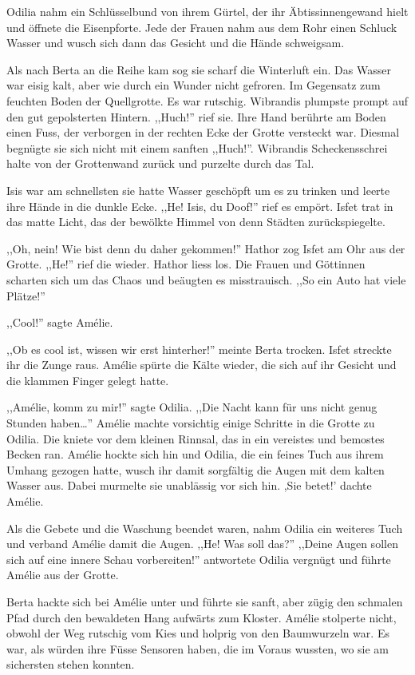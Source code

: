 Odilia nahm ein Schlüsselbund von ihrem Gürtel, der ihr Äbtissinnengewand hielt und öffnete die Eisenpforte. Jede der Frauen nahm aus dem Rohr einen Schluck Wasser und wusch sich dann das Gesicht und die Hände schweigsam.

Als \am nach Berta an die Reihe kam sog sie scharf die Winterluft ein. Das Wasser war eisig kalt, aber wie durch ein Wunder nicht gefroren. Im Gegensatz zum feuchten Boden der Quellgrotte. Es war rutschig. Wibrandis plumpste prompt auf den gut gepolsterten Hintern. ,,Huch!'' rief sie. Ihre Hand berührte am Boden einen Fuss, der verborgen in der rechten Ecke der Grotte versteckt war. Diesmal begnügte sie sich nicht mit einem sanften ,,Huch!''. Wibrandis Scheckensschrei halte von der Grottenwand zurück und purzelte durch das Tal.

Isis war am schnellsten sie hatte Wasser geschöpft um es zu trinken und leerte ihre Hände in die dunkle Ecke. ,,He! Isis, du Doof!'' rief es empört. Isfet trat in das matte Licht, das der bewölkte Himmel von denn Städten zurückspiegelte.

,,Oh, nein! Wie bist denn du daher gekommen!'' Hathor zog Isfet am Ohr aus der Grotte. ,,He!'' rief die wieder. Hathor liess los. Die Frauen und Göttinnen scharten sich um das Chaos und beäugten es misstrauisch. ,,So ein Auto hat viele Plätze!''

,,Cool!'' sagte Amélie.

,,Ob es cool ist, wissen wir erst hinterher!'' meinte Berta trocken. Isfet streckte ihr die Zunge raus. Amélie spürte die Kälte wieder, die sich auf ihr Gesicht und die klammen Finger gelegt hatte.

,,Amélie, komm zu mir!'' sagte Odilia. ,,Die Nacht kann für uns nicht genug Stunden haben\dots '' Amélie machte vorsichtig einige Schritte in die Grotte zu Odilia. Die kniete vor dem kleinen Rinnsal, das in ein vereistes und bemostes Becken ran. Amélie hockte sich hin und Odilia, die ein feines Tuch aus ihrem Umhang gezogen hatte, wusch ihr damit sorgfältig die Augen mit dem kalten Wasser aus. Dabei murmelte sie unablässig vor sich hin. ,Sie betet!' dachte Amélie.

Als die Gebete und die Waschung beendet waren, nahm Odilia ein weiteres Tuch und verband Amélie damit die Augen. ,,He! Was soll das?'' ,,Deine Augen sollen sich auf eine innere Schau vorbereiten!'' antwortete Odilia vergnügt und führte Amélie aus der Grotte.

Berta hackte sich bei Amélie unter und führte sie sanft, aber zügig den schmalen Pfad durch den bewaldeten Hang aufwärts zum Kloster. Amélie stolperte nicht, obwohl der Weg rutschig vom Kies und holprig von den Baumwurzeln war. Es war, als würden ihre Füsse Sensoren haben, die im Voraus wussten, wo sie am sichersten stehen konnten.

